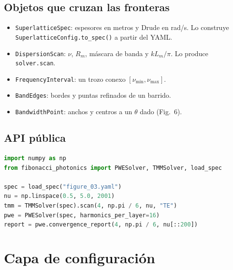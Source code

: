 \documentclass[11pt,a4paper]{article}
\begin{document}
\subsection{Objetos que cruzan las fronteras}

\begin{itemize}
\item \texttt{SuperlatticeSpec}: espesores en metros y Drude en rad/s.
Lo construye \texttt{SuperlatticeConfig.to\_spec()} a partir del YAML.
\item \texttt{DispersionScan}: \(\nu\), \(R_m\), máscara de banda y
\(k L_m/\pi\). Lo produce \texttt{solver.scan}.
\item \texttt{FrequencyInterval}: un trozo conexo \([\nu_{\min},\nu_{\max}]\).
\item \texttt{BandEdges}: bordes y puntas refinados de un barrido.
\item \texttt{BandwidthPoint}: anchos y centros a un \(\theta\) dado (Fig.~6).
\end{itemize}

\subsection{API pública}

\begin{lstlisting}[language=Python]
import numpy as np
from fibonacci_photonics import PWESolver, TMMSolver, load_spec

spec = load_spec("figure_03.yaml")
nu = np.linspace(0.5, 5.0, 2001)
tmm = TMMSolver(spec).scan(4, np.pi / 6, nu, "TE")
pwe = PWESolver(spec, harmonics_per_layer=16)
report = pwe.convergence_report(4, np.pi / 6, nu[::200])
\end{lstlisting}

\section{Capa de configuración}
\end{document}
